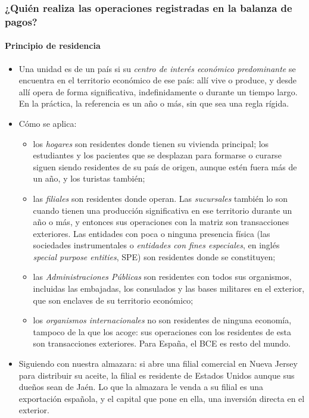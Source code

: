 \documentclass[11pt]{article}
\begin{document}
\subsubsection{¿Quién realiza las operaciones registradas en la balanza de pagos?}\label{sec:quien}

\paragraph{Principio de residencia}
\begin{itemize}
\item Una unidad es  de un país si su \emph{centro de interés económico predominante} se encuentra en el territorio económico de ese país: allí vive o produce, y desde allí opera de forma significativa, indefinidamente o durante un tiempo largo. En la práctica, la referencia es un año o más, sin que sea una regla rígida\nocite{FMI2009MBP6}.
\item Cómo se aplica:
  \begin{itemize}
  \item los \emph{hogares} son residentes donde tienen su vivienda principal; los estudiantes y los pacientes que se desplazan para formarse o curarse siguen siendo residentes de su país de origen, aunque estén fuera más de un año, y los turistas también;
  \item las \emph{filiales} son residentes donde operan. Las \emph{sucursales} también lo son cuando tienen una producción significativa en ese territorio durante un año o más, y entonces sus operaciones con la matriz son transacciones exteriores\nocite{FMI2009MBP6}. Las entidades con poca o ninguna presencia física (las sociedades instrumentales o \emph{entidades con fines especiales}, en inglés \emph{special purpose entities}, SPE) son residentes donde se constituyen;
  \item las \emph{Administraciones Públicas} son residentes con todos sus organismos, incluidas las embajadas, los consulados y las bases militares en el exterior, que son enclaves de su territorio económico;
  \item los \emph{organismos internacionales} no son residentes de ninguna economía, tampoco de la que los acoge: sus operaciones con los residentes de esta son transacciones exteriores. Para España, el BCE es resto del mundo.
  \end{itemize}
\item Siguiendo con nuestra almazara: si abre una filial comercial en Nueva Jersey para distribuir su aceite, la filial es residente de Estados Unidos aunque sus dueños sean de Jaén. Lo que la almazara le venda a su filial es una exportación española, y el capital que pone en ella, una inversión directa en el exterior.
\end{itemize}
\end{document}

